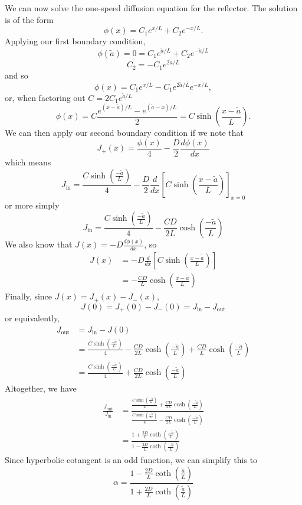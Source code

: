 \documentclass{article}
\begin{document}
We can now solve the one-speed diffusion equation for the reflector. The solution is of the form
$$ \phi(x) = C_1 e^{x/L} + C_2 e^{-x/L} .$$
Applying our first boundary condition,
$$ \phi(\tilde{a}) = 0 = C_1 e^{\tilde{a}/L} + C_2 e^{-\tilde{a}/L} $$
$$ C_2 = -C_1 e^{2\tilde{a}/L} $$
and so
$$ \phi(x) = C_1 e^{x/L} - C_1 e^{2\tilde{a}/L} e^{-x/L}, $$
or, when factoring out $C = 2 C_1 e^{\tilde{a}/L}$
$$ \phi(x) = C \frac{e^{(x-\tilde{a})/L} -  e^{(\tilde{a}-x)/L}}{2} = C \sinh\left(\frac{x-\tilde{a}}{L}\right). $$
We can then apply our second boundary condition if we note that 
$$ J_+(x) = \frac{\phi(x)}{4} - \frac{D}{2}\frac{d\phi(x)}{dx} $$
which means
$$ J_{\text{in}} = \frac{C \sinh\left(\frac{-\tilde{a}}{L}\right)}{4} - \frac{D}{2} \frac{d}{dx}\left[ C \sinh\left(\frac{x-\tilde{a}}{L}\right) \right]_{x=0} $$
or more simply
$$ J_{\text{in}} = \frac{C\sinh\left(\frac{-\tilde{a}}{L}\right)}{4} - \frac{CD}{2L}\cosh\left(\frac{-\tilde{a}}{L}\right) $$
We also know that $J(x) = -D\frac{d\phi(x)}{dx}$, so
\begin{align*}
 J(x)	&= -D \frac{d}{dx} \left[ C \sinh\left(\frac{x-\tilde{a}}{L}\right) \right]\\
 		&= -\frac{CD}{L} \cosh\left(\frac{x-\tilde{a}}{L}\right)
\end{align*}
Finally,  since $J(x) = J_+(x) - J_-(x)$,
$$ J(0) = J_+(0) - J_-(0) = J_{\text{in}}-J_{\text{out}} $$
or equivalently,
\begin{align*}
J_{\text{out}}	&= J_{\text{in}} - J(0) \\
				&= \frac{C\sinh\left(\frac{-\tilde{a}}{L}\right)}{4} - \frac{CD}{2L}\cosh\left(\frac{-\tilde{a}}{L}\right) +\frac{CD}{L} \cosh\left(\frac{-\tilde{a}}{L}\right) \\
				&= \frac{C\sinh\left(\frac{-\tilde{a}}{L}\right)}{4} + \frac{CD}{2L}\cosh\left(\frac{-\tilde{a}}{L}\right) 
\end{align*}
Altogether, we have
\begin{align*}
\frac{J_{\text{out}}}{J_{\text{in}}}	&= \frac{\frac{C\sinh\left(\frac{-\tilde{a}}{L}\right)}{4} + \frac{CD}{2L}\cosh\left(\frac{-\tilde{a}}{L}\right)}{\frac{C\sinh\left(\frac{-\tilde{a}}{L}\right)}{4} - \frac{CD}{2L}\cosh\left(\frac{-\tilde{a}}{L}\right)} \\
										&= \frac{1 + \frac{2D}{L}\coth\left(\frac{-\tilde{a}}{L}\right)}{1 - \frac{2D}{L}\coth\left(\frac{-\tilde{a}}{L}\right)} 
\end{align*}
Since hyperbolic cotangent is an odd function, we can simplify this to
$$\boxed{\alpha = \frac{1 - \frac{2D}{L}\coth\left(\frac{\tilde{a}}{L}\right)}{1 + \frac{2D}{L}\coth\left(\frac{\tilde{a}}{L}\right)} }$$ 
\end{document}

